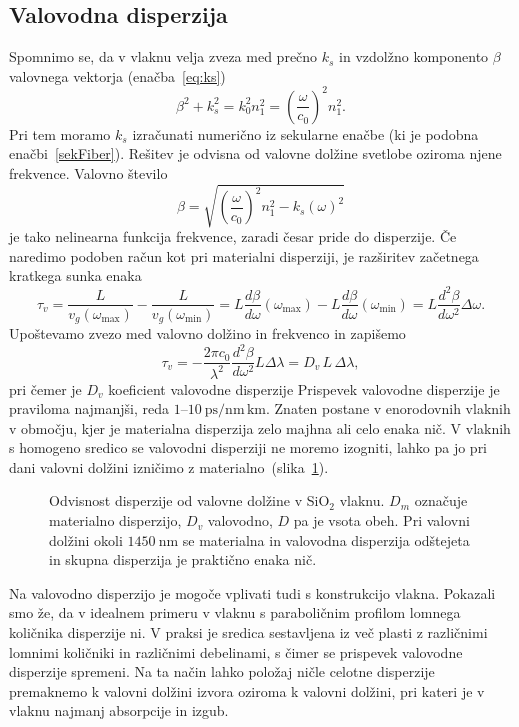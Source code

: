 \subsection*{Valovodna disperzija}
Spomnimo se, da v vlaknu velja zveza med prečno $k_s$ in vzdolžno komponento $\beta$ 
valovnega vektorja (enačba~\ref{eq:ks})
\begin{equation}
\beta^2 + k_s^2 = k_0^2 n_1^2 = \left( \frac{\omega}{c_0}\right)^2n_1^2.
\end{equation}
Pri tem moramo $k_s$ izračunati numerično iz sekularne enačbe (ki je podobna enačbi~\ref{sekFiber}). 
Rešitev je odvisna od valovne dolžine svetlobe oziroma njene frekvence. Valovno število  
\begin{equation}
\beta = \sqrt{\left( \frac{\omega}{c_0}\right)^2n_1^2 - k_s(\omega)^2}
\end{equation}
je tako nelinearna funkcija frekvence, zaradi česar pride do disperzije. Če naredimo podoben 
račun kot pri materialni disperziji, je razširitev začetnega kratkega sunka enaka
\begin{equation}
\tau_v = \frac{L}{v_g(\omega_{\mathrm{max}})} - \frac{L}{v_g(\omega_{\mathrm{min}})} = 
L\frac{d \beta}{d\omega}(\omega_{\mathrm{max}}) - L\frac{d \beta}{d\omega}(\omega_{\mathrm{min}})=
L \frac{d^2\beta}{d\omega^2}\Delta \omega.
\label{ValD}
\end{equation}
Upoštevamo zvezo med valovno dolžino in frekvenco in zapišemo 
\begin{equation}
\tau_v=-\frac{2 \pi c_0}{\lambda^2}\frac{d^2\beta}{d\omega^2}L \Delta \lambda= D_v\,L\, \Delta \lambda,
\end{equation}
pri čemer je  $D_v$ koeficient valovodne disperzije
Prispevek valovodne disperzije je praviloma najmanjši, reda 
$1$--$10~\si{\pico\second/\nano\meter\,\kilo\meter}$. 
Znaten postane v enorodovnih vlaknih v območju, kjer je materialna disperzija 
zelo majhna ali celo enaka nič. 
V vlaknih s homogeno sredico se valovodni disperziji ne moremo
izogniti, lahko pa jo pri dani valovni dolžini izničimo z materialno~(slika~\ref{fig:MatVal}). 
\begin{figure}[h]
\centering
\def\svgwidth{90truemm} 
 
\caption{Odvisnost disperzije od valovne dolžine v SiO$_2$ vlaknu. $D_m$ 
označuje materialno disperzijo, $D_v$ valovodno, $D$ pa je vsota obeh. Pri valovni dolžini
okoli $1450~\si{\nano\meter}$ se materialna in valovodna disperzija odštejeta in skupna disperzija
je praktično enaka nič.}
\label{fig:MatVal}
\end{figure}
\begin{remark}
Na valovodno disperzijo je mogoče vplivati tudi s konstrukcijo vlakna. Pokazali smo že, da
v idealnem primeru v vlaknu s paraboličnim profilom lomnega količnika disperzije ni. 
V praksi je sredica sestavljena iz več plasti z različnimi lomnimi količniki in različnimi
debelinami, s čimer se prispevek valovodne disperzije spremeni. Na ta način lahko 
položaj ničle celotne disperzije premaknemo k valovni dolžini izvora oziroma k 
valovni dolžini, pri kateri je v vlaknu najmanj absorpcije in izgub.
\end{remark}


